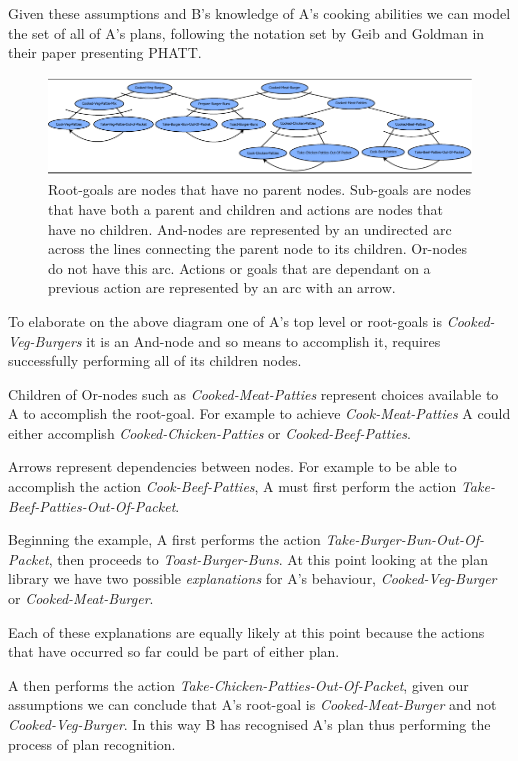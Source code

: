 \documentclass[parskip]{cs4rep}
\begin{document}
Given these assumptions and B's knowledge of A's cooking abilities we can model the set of all of A's plans, following the notation set by Geib and Goldman in their paper presenting PHATT.

\begin{figure}[h]
\centerline{
	\includegraphics{images/example-plan-library.pdf}
}
\caption{Root-goals are nodes that have no parent nodes. Sub-goals are nodes that have both a parent and children and actions are nodes that have no children. And-nodes are represented by an undirected arc across the lines connecting the parent node to its children. Or-nodes do not have this arc. Actions or goals that are dependant on a previous action are represented by an arc with an arrow.}
\label{fig:example-plan-library}
\end{figure}

To elaborate on the above diagram one of A's top level or root-goals is \textit{Cooked-Veg-Burgers} it is an And-node and so means to accomplish it, requires successfully performing all of its children nodes. 

Children of Or-nodes such as \textit{Cooked-Meat-Patties} represent choices available to A to accomplish the root-goal. For example to achieve \textit{Cook-Meat-Patties} A could either accomplish \textit{Cooked-Chicken-Patties} or \textit{Cooked-Beef-Patties}.

Arrows represent dependencies between nodes. For example to be able to accomplish the action \textit{Cook-Beef-Patties}, A must first perform the action \textit{Take-Beef-Patties-Out-Of-Packet}.

Beginning the example, A first performs the action \textit{Take-Burger-Bun-Out-Of-Packet}, then proceeds to \textit{Toast-Burger-Buns}. At this point looking at the plan library we have two possible \textit{explanations} for A's behaviour, \textit{Cooked-Veg-Burger} or \textit{Cooked-Meat-Burger}.

Each of these explanations are equally likely at this point because the actions that have occurred so far could be part of either plan.

A then performs the action \textit{Take-Chicken-Patties-Out-Of-Packet}, given our assumptions we can conclude that A's root-goal is \textit{Cooked-Meat-Burger} and not \textit{Cooked-Veg-Burger}. In this way B has recognised A's plan thus performing the process of plan recognition.
\end{document}
